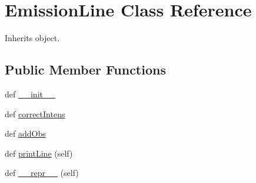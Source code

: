 \hypertarget{classpyneb_1_1core_1_1pynebcore_1_1_emission_line}{}\section{Emission\+Line Class Reference}
\label{classpyneb_1_1core_1_1pynebcore_1_1_emission_line}


Inherits object.

\subsection*{Public Member Functions}
\begin{DoxyCompactItemize}
\item 
def \hyperlink{classpyneb_1_1core_1_1pynebcore_1_1_emission_line_ac775ee34451fdfa742b318538164070e}{\+\_\+\+\_\+init\+\_\+\+\_\+}
\item 
def \hyperlink{classpyneb_1_1core_1_1pynebcore_1_1_emission_line_a3385d0660407ddbdbc78b2ab44c9e25e}{correct\+Intens}
\item 
def \hyperlink{classpyneb_1_1core_1_1pynebcore_1_1_emission_line_ada122b7940c9876783a28ae85efb978b}{add\+Obs}
\item 
def \hyperlink{classpyneb_1_1core_1_1pynebcore_1_1_emission_line_af69f5ecca873fc4e737d0186c6aa64ac}{print\+Line} (self)
\item 
def \hyperlink{classpyneb_1_1core_1_1pynebcore_1_1_emission_line_a9a47563093dfc5ba12274b66e368920c}{\+\_\+\+\_\+repr\+\_\+\+\_\+} (self)
\end{DoxyCompactItemize}
